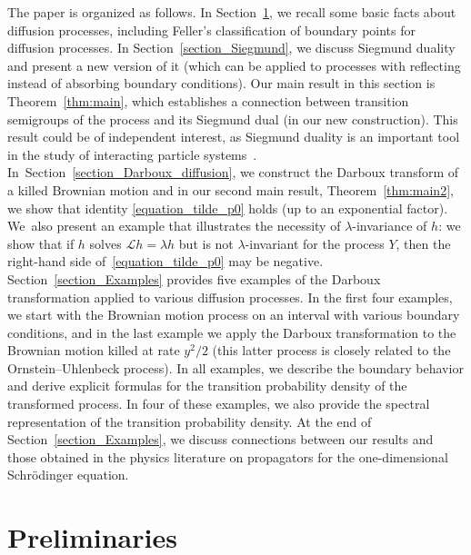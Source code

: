 \documentclass[10pt,a4paper]{amsart}
\numberwithin{equation}{section}
\theoremstyle{definition}
\def\L{{\mathcal L}}
\begin{document}
The paper is organized as follows. In Section~\ref{section_preliminaries}, we recall some basic facts about diffusion processes, including Feller’s classification of boundary points for diffusion processes. In Section~\ref{section_Siegmund}, we discuss Siegmund duality \cite{Clifford_1985,Siegmund_1976} and present a new version of it (which can be applied to processes with reflecting instead of absorbing boundary conditions). Our main result in this section is Theorem~\ref{thm:main}, which establishes a connection between transition semigroups of the process and its Siegmund dual (in our new construction). This result could be of independent interest, as Siegmund duality is an important tool in the study of interacting particle systems~\mbox{\cite{Assiotis2018,Assiotis2023,Assiotis2019}}. In~Section~\ref{section_Darboux_diffusion}, we construct the Darboux transform of a killed Brownian motion and in our second main result, Theorem~\ref{thm:main2}, we show that identity \eqref{equation_tilde_p0} holds (up to an exponential factor). We~also present an example that illustrates the necessity of $\lambda$-invariance of $h$: we show that if $h$ solves $\L h=\lambda h$ but is not $\lambda$-invariant for the process $Y$, then the right-hand side of~\eqref{equation_tilde_p0} may be negative. Section~\ref{section_Examples} provides five examples of the Darboux transformation applied to various diffusion processes. In the first four examples, we start with the Brownian motion process on an interval with various boundary conditions, and in the last example we apply the Darboux transformation to the Brownian motion killed at rate $y^2/2$ (this latter process is closely related to the Ornstein–Uhlenbeck process). In all examples, we describe the boundary behavior and derive explicit formulas for the transition probability density of the transformed process. In four of these examples, we also provide the spectral representation of the transition probability density. At the end of Section~\ref{section_Examples}, we discuss connections between our results and those obtained in the physics literature on propagators for the one-dimensional Schr\"odinger equation.

\section{Preliminaries}\label{section_preliminaries}
\end{document}
